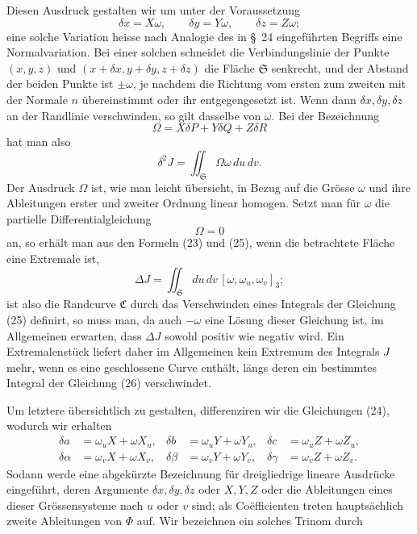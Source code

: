 \documentclass[11pt,a4paper,leqno]{article}
\begin{document}
Diesen Ausdruck gestalten wir um unter der Voraussetzung
\begin{equation}\tag{24}
\delta x=X\omega,\qquad \delta y=Y\omega,\qquad \delta z=Z\omega;
\end{equation}
eine solche Variation heisse nach Analogie des in \S~24 eingeführten
Begriffs eine Normalvariation. Bei einer solchen schneidet die
Verbindungslinie der Punkte $(x,y,z)$ und
$(x+\delta x,y+\delta y,z+\delta z)$ die Fläche $\mathfrak{S}$ senkrecht,
und der Abstand der beiden Punkte ist $\pm\omega$, je nachdem die Richtung
vom ersten zum zweiten mit der Normale $n$ übereinstimmt oder ihr
entgegengesetzt ist. Wenn dann $\delta x,\delta y,\delta z$ an der Randlinie
verschwinden, so gilt dasselbe von $\omega$. Bei der Bezeichnung
\[
\Omega=X\delta P+Y\delta Q+Z\delta R
\]
hat man also
\begin{equation}\tag{25}
\delta^2J=\iint_{\mathfrak{S}}\Omega\omega\,du\,dv.
\end{equation}
Der Ausdruck $\Omega$ ist, wie man leicht übersieht, in Bezug auf die
Grösse $\omega$ und ihre Ableitungen erster und zweiter Ordnung linear
homogen. Setzt man für $\omega$ die partielle Differentialgleichung
\begin{equation}\tag{26}
\Omega=0
\end{equation}
an, so erhält man aus den Formeln (23) und (25), wenn die betrachtete
Fläche eine Extremale ist,
\[
\Delta J=\iint_{\mathfrak{S}}du\,dv\,[\omega,\omega_u,\omega_v]_3;
\]
ist also die Randcurve $\mathfrak{C}$ durch das Verschwinden eines
Integrals der Gleichung (25) definirt, so muss man, da auch $-\omega$ eine
Lösung dieser Gleichung ist, im Allgemeinen erwarten, dass $\Delta J$
sowohl positiv wie negativ wird. Ein Extremalenstück liefert daher im
Allgemeinen kein Extremum des Integrals $J$ mehr, wenn es eine geschlossene
Curve enthält, längs deren ein bestimmtes Integral der Gleichung (26)
verschwindet.

Um letztere übersichtlich zu gestalten, differenziren wir die Gleichungen
(24), wodurch wir erhalten
\[
\begin{aligned}
\delta a&=\omega_uX+\omega X_u,&
\delta b&=\omega_uY+\omega Y_u,&
\delta c&=\omega_uZ+\omega Z_u,\\
\delta\alpha&=\omega_vX+\omega X_v,&
\delta\beta&=\omega_vY+\omega Y_v,&
\delta\gamma&=\omega_vZ+\omega Z_v.
\end{aligned}
\]
Sodann werde eine abgekürzte Bezeichnung für dreigliedrige lineare
Ausdrücke eingeführt, deren Argumente $\delta x,\delta y,\delta z$ oder
$X,Y,Z$ oder die Ableitungen eines dieser Grössensysteme nach $u$ oder $v$
sind; als Coëfficienten treten hauptsächlich zweite Ableitungen von $\Phi$
auf. Wir bezeichnen ein solches Trinom durch
\end{document}
